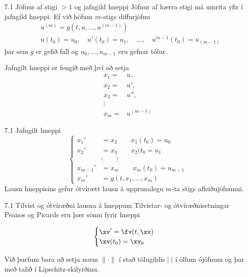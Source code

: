 \begin{frame}{7.1 Jöfnur af stigi $>1$ og jafngild hneppi}
Jöfnur af hærra stigi má umrita yfir í jafngild hneppi. 
Ef við höfum $m$-stigs diffurjöfnu
\begin{align*}
&u^{(m)} = g(t,u, \ldots , u^{(m-1)})\\
&u(t_0) = u_0, \quad u'(t_0) = u_1, \quad \ldots, \quad  u^{m-1}(t_0) = u_{(m-1)}
\end{align*}
þar sem $g$ er gefið fall og $u_0, \ldots , u_{m-1}$ eru gefnar tölur.

\pause
\smallskip
Jafngilt hneppi er fengið með því að setja 
\begin{align*}
x_1 =& u, \\
x_2 =& u', \\
x_3 =& u'', \\
\vdots& \\
x_m =& u^{(m-1)}
\end{align*}
\end{frame}


\begin{frame}{7.1 Jafngilt hneppi} 
\begin{equation*}
\begin{cases}
x_1' &= x_2 \qquad x_1(t_0) = u_0\\
x_2' &= x_3 \qquad x_2(t_0 = u_1\\
&\vdots \qquad \vdots\\
x_{m-1}' &= x_m \qquad x_m(t_0) = u_{m-1}\\
x_m' &= g(t,x_1, \ldots , x_m)
\end{cases}
\end{equation*}
Lausn hneppisins gefur ótvírætt lausn á upprunalegu $m$-ta stigs 
afleiðujöfnunni.
\end{frame}


\begin{frame}{7.1 Tilvist og ótvíræðni lausna á hneppum} 
Tilvistar- og ótvíræðnisetningar Peanos og  Picards 
eru þær sömu fyrir hneppi

\begin{equation*}
\begin{cases}
\xv' =\fv(t,\xv)\\
\xv(t_0) = \xv_0
\end{cases}
\end{equation*}

\pause
\smallskip
Við þurfum bara að 
setja norm $\|\cdot\|$ í stað tölugildis $|\cdot|$ í öllum ójöfnum og
þar með talið í Lipschitz-skilyrðinu.
\end{frame}



